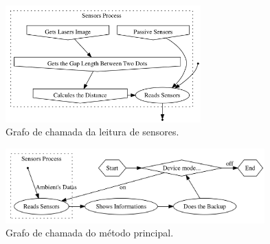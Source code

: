    \begin{frame}[plain] \vspace{-0.8em}
      
      \begin{figure}[h] \centering
         \includegraphics[width=0.67\textwidth]{img/graph_wearable3_b.png}
         \vspace{-1em}
         \caption{Grafo de chamada da leitura de sensores.}
      \end{figure}
      
      \begin{figure}[h] \centering
         \includegraphics[width=0.89\textwidth]{img/graph_wearable3.png}
         \vspace{-1em}
         \caption{Grafo de chamada do método principal.}
      \end{figure}
      
   \end{frame}



